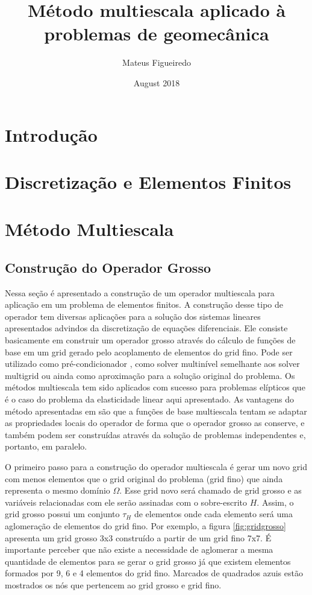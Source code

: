 \documentclass{article}
\title{Método multiescala aplicado à problemas de geomecânica}
\author{Mateus Figueiredo}
\date{August 2018}
\begin{document}
\maketitle

\section{Introdução}




\section{Discretização e Elementos Finitos \label{ch:discretizacao}}


\section{Método Multiescala}

\subsection{Construção do Operador Grosso}

Nessa seção é apresentado a construção de um operador multiescala para aplicação em um problema de elementos finitos. A construção desse tipo de operador tem diversas aplicações para a solução dos sistemas lineares apresentados advindos da discretização de equações diferenciais. Ele consiste basicamente em construir um operador grosso através do cálculo de funções de base em um grid gerado pelo acoplamento de elementos do grid fino. Pode ser utilizado como pré-condicionador \cite{casteletto}, como solver multinível semelhante aos solver multigrid ou ainda como aproximação para a solução original do problema. Os métodos multiescala tem sido aplicados com sucesso para problemas elípticos que é o caso do problema da elasticidade linear aqui apresentado. As vantagens do método apresentadas em \cite{thomashou} são que a funções de base multiescala tentam se adaptar as propriedades locais do operador de forma que o operador grosso as conserve, e também podem ser construídas através da solução de problemas independentes e, portanto, em paralelo.

O primeiro passo para a construção do operador multiescala é gerar um novo grid com menos elementos que o grid original do problema (grid fino) que ainda representa o mesmo domínio $\Omega$. Esse grid novo será chamado de grid grosso e as variáveis relacionadas com ele serão assinadas com o sobre-escrito $H$. 
Assim, o grid grosso possui um conjunto $\tau_H$ de elementos onde cada elemento será uma aglomeração de elementos do grid fino. Por exemplo, a figura \ref{fig:gridgrosso} apresenta um grid grosso 3x3 construído a partir de um grid fino 7x7. É importante perceber que não existe a necessidade de aglomerar a mesma quantidade de elementos para se gerar o grid grosso já que existem elementos formados por 9, 6 e 4 elementos do grid fino. Marcados de quadrados azuis estão mostrados os nós que pertencem ao grid grosso e grid fino.
\end{document}
